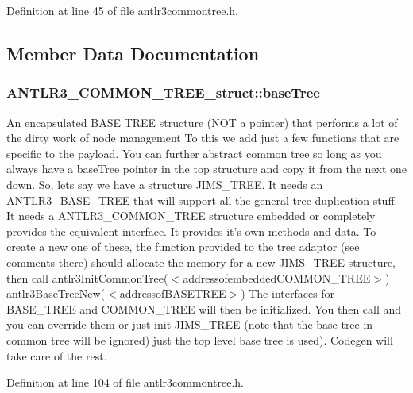 Definition at line 45 of file antlr3commontree.\-h.



\subsection{Member Data Documentation}
\hypertarget{struct_a_n_t_l_r3___c_o_m_m_o_n___t_r_e_e__struct_aab30e9fd47c078a3343498ca41bb2b0d}{
\subsubsection[{base\-Tree}]{ A\-N\-T\-L\-R3\-\_\-\-C\-O\-M\-M\-O\-N\-\_\-\-T\-R\-E\-E\-\_\-struct\-::base\-Tree}}\label{struct_a_n_t_l_r3___c_o_m_m_o_n___t_r_e_e__struct_aab30e9fd47c078a3343498ca41bb2b0d}
An encapsulated B\-A\-S\-E T\-R\-E\-E structure (N\-O\-T a pointer) that performs a lot of the dirty work of node management To this we add just a few functions that are specific to the payload. You can further abstract common tree so long as you always have a base\-Tree pointer in the top structure and copy it from the next one down. So, lets say we have a structure J\-I\-M\-S\-\_\-\-T\-R\-E\-E. It needs an A\-N\-T\-L\-R3\-\_\-\-B\-A\-S\-E\-\_\-\-T\-R\-E\-E that will support all the general tree duplication stuff. It needs a A\-N\-T\-L\-R3\-\_\-\-C\-O\-M\-M\-O\-N\-\_\-\-T\-R\-E\-E structure embedded or completely provides the equivalent interface. It provides it's own methods and data. To create a new one of these, the function provided to the tree adaptor (see comments there) should allocate the memory for a new J\-I\-M\-S\-\_\-\-T\-R\-E\-E structure, then call antlr3\-Init\-Common\-Tree($<$addressofembedded\-C\-O\-M\-M\-O\-N\-\_\-\-T\-R\-E\-E$>$) antlr3\-Base\-Tree\-New($<$addressof\-B\-A\-S\-E\-T\-R\-E\-E$>$) The interfaces for B\-A\-S\-E\-\_\-\-T\-R\-E\-E and C\-O\-M\-M\-O\-N\-\_\-\-T\-R\-E\-E will then be initialized. You then call and you can override them or just init J\-I\-M\-S\-\_\-\-T\-R\-E\-E (note that the base tree in common tree will be ignored) just the top level base tree is used). Codegen will take care of the rest. 

Definition at line 104 of file antlr3commontree.\-h.

